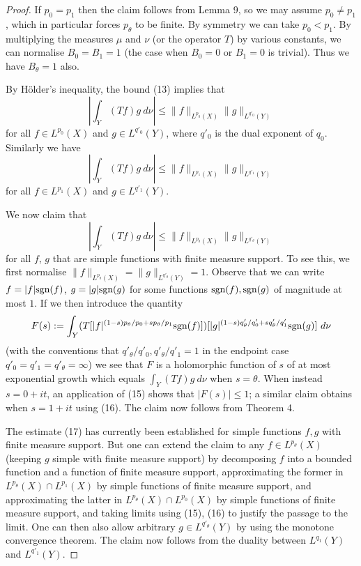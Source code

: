 \documentclass[10pt,reqno]{amsart}
\begin{document}
\begin{proof}
    If $p_0=p_1$ then the claim follows from Lemma 9, so we may assume $p_0 \neq p_1$, which in particular forces $p_\theta$ to be finite. By symmetry we can take $p_0 < p_1$. By multiplying the measures $\mu$ and $\nu$ (or the operator $T$) by various constants, we can normalise $B_0=B_1=1$ (the case when $B_0=0$ or $B_1=0$ is trivial). Thus we have $B_\theta=1$ also.

    By Hölder’s inequality, the bound (13) implies that
    \begin{equation} \left|\int_Y (Tf) g\ d\nu \right| \leq \| f\|_{L^{p_0}(X)} \|g\|_{L^{q'_0}(Y)} \end{equation}
    for all $f \in L^{p_0}(X)$ and $g \in L^{q'_0}(Y)$, where $q'_0$ is the dual exponent of $q_0$. Similarly we have
    \begin{equation} \left|\int_Y (Tf) g\ d\nu \right| \leq \| f\|_{L^{p_1}(X)} \|g\|_{L^{q'_1}(Y)} \end{equation}
    for all $f \in L^{p_1}(X)$ and $g \in L^{q'_1}(Y)$.

    We now claim that
    \begin{equation} \left|\int_Y (Tf) g\ d\nu \right| \leq \| f\|_{L^{p_\theta}(X)} \|g\|_{L^{q'_\theta}(Y)} \end{equation}
    for all $f$, $g$ that are simple functions with finite measure support. To see this, we first normalise $\| f\|_{L^{p_\theta}(X)} = \|g\|_{L^{q'_\theta}(Y)} = 1$. Observe that we can write $f = |f| \hbox{sgn}(f)$, $g = |g| \hbox{sgn}(g)$ for some functions $\hbox{sgn}(f), \hbox{sgn}(g)$ of magnitude at most $1$. If we then introduce the quantity
    \[ F(s) := \int_Y (T [ |f|^{(1-s) p_\theta/p_0 + s p_\theta/p_1} \hbox{sgn}(f) ]) [ |g|^{(1-s) q'_\theta/q'_0 + s q'_\theta/q'_1} \hbox{sgn}(g) ]\ d\nu\]
    (with the conventions that $q'_\theta/q'_0, q'_\theta/q'_1 = 1$ in the endpoint case $q'_0=q'_1=q'_\theta=\infty$) we see that $F$ is a holomorphic function of $s$ of at most exponential growth which equals $\int_Y (Tf) g\ d\nu$ when $s=\theta$. When instead $s=0+it$, an application of (15) shows that $|F(s)| \leq 1$; a similar claim obtains when $s=1+it$ using (16). The claim now follows from Theorem 4.

    The estimate (17) has currently been established for simple functions $f, g$ with finite measure support. But one can extend the claim to any $f \in L^{p_\theta}(X)$ (keeping $g$ simple with finite measure support) by decomposing $f$ into a bounded function and a function of finite measure support, approximating the former in $L^{p_\theta}(X) \cap L^{p_1}(X)$ by simple functions of finite measure support, and approximating the latter in $L^{p_\theta}(X) \cap L^{p_0}(X)$ by simple functions of finite measure support, and taking limits using (15), (16) to justify the passage to the limit. One can then also allow arbitrary $g \in L^{q'_\theta}(Y)$ by using the monotone convergence theorem. The claim now follows from the duality between $L^{q_1}(Y)$ and $L^{q'_1}(Y)$.
\end{proof}
\end{document}
